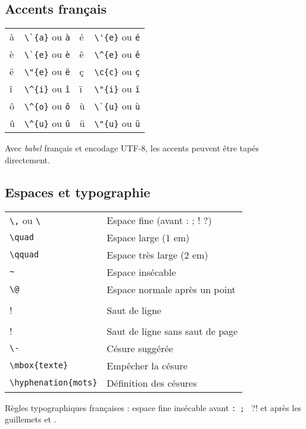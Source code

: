 \documentclass{article}
\let\code\lstinline
\begin{document}
\begin{multicols*}{3}
\subsection*{Accents français}
\begin{tabular}{p{1.5cm}p{2cm}p{1.5cm}l}
à & \code+\`{a}+ ou \verb+à+ & é & \code+\'{e}+ ou \verb+é+ \\
è & \code+\`{e}+ ou \verb+è+ & ê & \code+\^{e}+ ou \verb+ê+ \\
ë & \code+\"{e}+ ou \verb+ë+ & ç & \code+\c{c}+ ou \verb+ç+ \\
î & \code+\^{i}+ ou \verb+î+ & ï & \code+\"{i}+ ou \verb+ï+ \\
ô & \code+\^{o}+ ou \verb+ô+ & ù & \code+\`{u}+ ou \verb+ù+ \\
û & \code+\^{u}+ ou \verb+û+ & ü & \code+\"{u}+ ou \verb+ü+ \\
\end{tabular}

Avec \emph{babel} français et encodage UTF-8, les accents peuvent être tapés directement.

\subsection*{Espaces et typographie}
\begin{tabular}{*2{>{}l}}
\code!\,! ou \code!\ ! & Espace fine (avant : ; ! ?) \\
\code!\quad! & Espace large (1 em) \\
\code!\qquad! & Espace très large (2 em) \\
\code!~! & Espace insécable \\
\code!\@! & Espace normale après un point \\
\code!\\! & Saut de ligne \\
\code!\\*! & Saut de ligne sans saut de page \\
\code!\-! & Césure suggérée \\
\code!\mbox{texte}! & Empêcher la césure \\
\code!\hyphenation{mots}! & Définition des césures \\
\end{tabular}

Règles typographiques françaises : espace fine insécable avant \code!: ; ! ?! et après les guillemets \og{} et \fg{}.



\end{multicols*}
\end{document}
